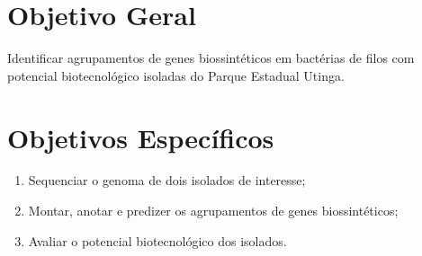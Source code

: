 \section{Objetivo Geral}

Identificar agrupamentos de genes biossintéticos 
em bactérias de filos com potencial biotecnológico isoladas do Parque Estadual Utinga.

\section{Objetivos Específicos}
\begin{enumerate}
    \item Sequenciar o genoma de dois isolados de interesse;
    \item Montar, anotar e predizer os agrupamentos de genes biossintéticos;
    \item Avaliar o potencial biotecnológico dos isolados.
\end{enumerate}





